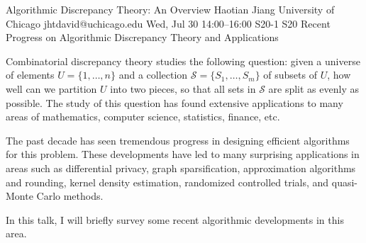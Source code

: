\begin{talk}
  {Algorithmic Discrepancy Theory: An Overview}%
  {Haotian Jiang}%
  {University of Chicago}%
  {jhtdavid@uchicago.edu}%
  {}%
  {}%
  {Wed, Jul 30 14:00–16:00}%
  {S20-1}%
  {S20}%
  {}
  {Recent Progress on Algorithmic Discrepancy Theory and Applications}
				
			
Combinatorial discrepancy theory studies the following question: given a universe of elements $U=\{1,\ldots, n\}$ and a collection $\mathcal{S} = \{S_1, \ldots, S_m\}$ of subsets of $U$, how well can we partition $U$ into two pieces, so that all sets in $\mathcal{S}$ are split as evenly as possible.
The study of this question has found extensive applications to many areas of mathematics, computer science, statistics, finance, etc. 

The past decade has seen tremendous progress in designing efficient algorithms for this problem. These developments have led to many surprising applications in areas such as differential privacy, graph sparsification, approximation algorithms and rounding, kernel density estimation, randomized controlled trials, and quasi-Monte Carlo methods.

In this talk, I will briefly survey some recent algorithmic developments in this area. 



\end{talk}


